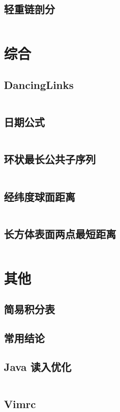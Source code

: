 \documentclass[titlepage,landscape,a4paper,10pt]{article}
\begin{document}
\begin{multicols}{2}
\begin{spacing}{0.8}
\subsection{轻重链剖分}
\inputminted{cpp}{src/轻重链剖分.cpp}

\section{综合}

\subsection{DancingLinks}
\inputminted{cpp}{src/DancingLinks.cpp}

\subsection{日期公式}
\inputminted{cpp}{improve/日期公式.cpp}

\subsection{环状最长公共子序列}
\inputminted{cpp}{improve/CycleLongest.cpp}

\subsection{经纬度球面距离}
\inputminted{cpp}{src/经纬度求球面最短距离.cpp}

\subsection{长方体表面两点最短距离}
\inputminted{cpp}{src/长方体表面两点最短距离.cpp}

\section{其他}

\subsection{简易积分表}


\subsection{常用结论}


\subsection{Java 读入优化}
\inputminted{java}{src/Main.java}

\subsection{Vimrc}
\inputminted{text}{src/vimrc.vim}

\end{spacing}
\end{multicols}
\end{document}

